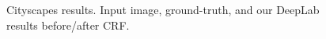 \begin{figure}[!t]
{\begin{tabular}{c}



  \end{tabular}
  }
  \caption{Cityscapes results. Input image, ground-truth,
    and our DeepLab results before/after CRF.}
  \label{fig:cityscapes_val_results}
\end{figure}


